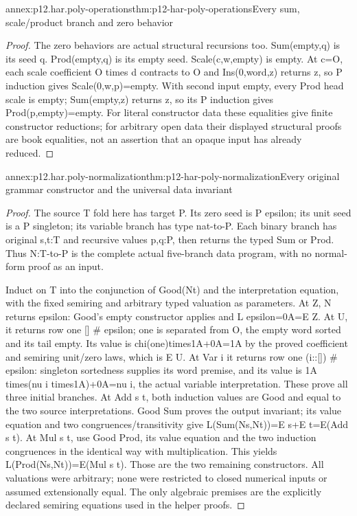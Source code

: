 \begin{annexitem}{annex:p12.har.poly-operations}{thm:p12-har-poly-operations}{Every sum, scale/product branch and zero behavior}
\begin{proof}
The zero behaviors are actual structural recursions too. Sum(empty,q)
is its seed q. Prod(empty,q) is its empty seed. Scale(c,w,empty) is
empty. At c=O, each scale coefficient O times d contracts to O
and Ins(0,word,z) returns z, so P induction gives Scale(0,w,p)=empty.
With second input empty, every Prod head scale is empty; Sum(empty,z)
returns z, so its P induction gives Prod(p,empty)=empty. For literal
constructor data these equalities give finite constructor reductions;
for arbitrary open data their displayed structural proofs are book
equalities, not an assertion that an opaque input has already reduced.
\end{proof}
\end{annexitem}

\begin{annexitem}{annex:p12.har.poly-normalization}{thm:p12-har-poly-normalization}{Every original grammar constructor and the universal data invariant}
\begin{proof}
The source T fold here has target P. Its zero seed is P epsilon;
its unit seed is a P singleton; its variable branch has type
nat-to-P. Each binary branch has original s,t:T and recursive values
p,q:P, then returns the typed Sum or Prod. Thus N:T-to-P is the
complete actual five-branch data program, with no normal-form proof
as an input.

Induct on T into the conjunction of Good(Nt) and the interpretation
equation, with the fixed semiring and arbitrary typed valuation as
parameters. At Z, N returns epsilon: Good's empty constructor applies
and L epsilon=0A=E Z. At U, it returns row one [] \# epsilon;
one is separated from O, the empty word sorted and its tail empty.
Its value is chi(one)times1A+0A=1A by the proved coefficient and
semiring unit/zero laws, which is E U. At Var i it returns row one
(i::[]) \# epsilon: singleton sortedness supplies its word premise,
and its value is 1A times(nu i times1A)+0A=nu i, the actual variable
interpretation. These prove all three initial branches.
At Add s t, both induction values are Good and equal to the two
source interpretations. Good Sum proves the output invariant; its
value equation and two congruences/transitivity give
L(Sum(Ns,Nt))=E s+E t=E(Add s t). At Mul s t, use Good Prod,
its value equation and the two induction congruences in the identical
way with multiplication. This yields L(Prod(Ns,Nt))=E(Mul s t).
Those are the two remaining constructors. All valuations were arbitrary;
none were restricted to closed numerical inputs or assumed extensionally
equal. The only algebraic premises are the explicitly declared semiring
equations used in the helper proofs.
\end{proof}
\end{annexitem}

